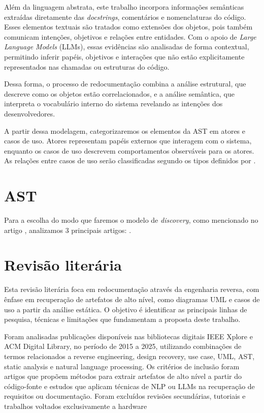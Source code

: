 \documentclass[12pt,a4paper]{article}
\begin{document}
Além da linguagem abstrata, este trabalho incorpora informações semânticas extraídas diretamente das \textit{docstrings}, comentários e nomenclaturas do código. Esses elementos textuais são tratados como extensões dos objetos, pois também comunicam intenções, objetivos e relações entre entidades. Com o apoio de \textit{Large Language Models} (LLMs), essas evidências são analisadas de forma contextual, permitindo inferir papéis, objetivos e interações que não estão explicitamente representados nas chamadas ou estruturas do código.

Dessa forma, o processo de redocumentação combina a análise estrutural, que descreve como os objetos estão correlacionados, e a análise semântica, que interpreta o vocabulário interno do sistema revelando as intenções dos desenvolvedores. 

A partir dessa modelagem, categorizaremos os elementos da AST em atores e casos de uso. Atores representam papéis externos que interagem com o sistema, enquanto os casos de uso descrevem comportamentos observáveis para os atores. As relações entre casos de uso serão classificadas segundo os tipos definidos por \textcite{booch1999unified}. 


\section{AST}
Para a escolha do modo que faremos o modelo de \textit{discovery}, como mencionado no artigo \textcite{Bruneliere2010MoDisco}, analizamos 3 principais artigos: \textcite{feng2020codebert, feng2020codebert, ngo2023exploring}.

\section{Revisão literária}
Esta revisão literária foca em redocumentação através da engenharia reversa, com ênfase em recuperação de artefatos de alto nível, como diagramas UML e casos de uso a partir da análise estática. O objetivo é identificar as principais linhas de pesquisa, técnicas e limitações que fundamentam a proposta deste trabalho.

Foram analisadas publicações disponíveis nas bibliotecas digitais IEEE Xplore e ACM Digital Library, no período de 2015 a 2025, utilizando combinações de termos relacionados a reverse engineering, design recovery, use case, UML, AST, static analysis e natural language processing. Os critérios de inclusão foram artigos que propõem métodos para extrair artefatos de alto nível a partir do código-fonte e estudos que aplicam técnicas de NLP ou LLMs na recuperação de requisitos ou documentação. Foram excluídos revisões secundárias, tutoriais e trabalhos voltados exclusivamente a hardware
\end{document}
